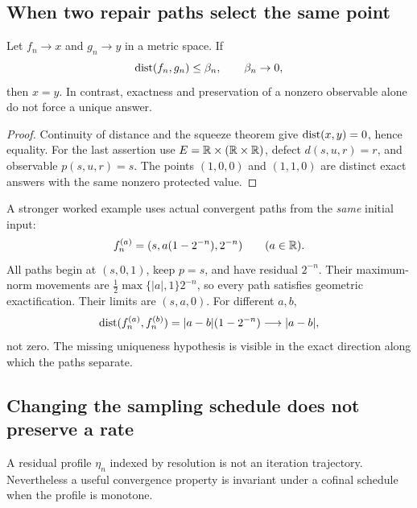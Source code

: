\subsection{When two repair paths select the same point}
\begin{proposition}\label{KS74}
Let \(f_n\to x\) and \(g_n\to y\) in a metric space. If
\[
 \operatorname{dist}(f_n,g_n)\le\beta_n,\qquad\beta_n\to0,
\]
then \(x=y\). In contrast, exactness and preservation of a nonzero observable alone do not force a unique answer.
\end{proposition}
\begin{proof}
Continuity of distance and the squeeze theorem give \(\operatorname{dist}(x,y)=0\), hence equality. For the last assertion use \(E=\mathbb R\times(\mathbb R\times\mathbb R)\), defect \(d(s,u,r)=r\), and observable \(p(s,u,r)=s\). The points \((1,0,0)\) and \((1,1,0)\) are distinct exact answers with the same nonzero protected value.
\end{proof}
A stronger worked example uses actual convergent paths from the \emph{same} initial input:
\[
 f_n^{(a)}=(s,a(1-2^{-n}),2^{-n})\qquad(a\in\mathbb R).
\]
All paths begin at \((s,0,1)\), keep \(p=s\), and have residual \(2^{-n}\). Their maximum-norm movements are \(\frac12\max\{|a|,1\}2^{-n}\), so every path satisfies geometric exactification. Their limits are \((s,a,0)\). For different \(a,b\),
\[
 \operatorname{dist}(f_n^{(a)},f_n^{(b)})=|a-b|(1-2^{-n})\longrightarrow|a-b|,
\]
not zero. The missing uniqueness hypothesis is visible in the exact direction along which the paths separate.


\subsection{Changing the sampling schedule does not preserve a rate}
A residual profile \(\eta_n\) indexed by resolution is not an iteration trajectory. Nevertheless a useful convergence property is invariant under a cofinal schedule when the profile is monotone.

